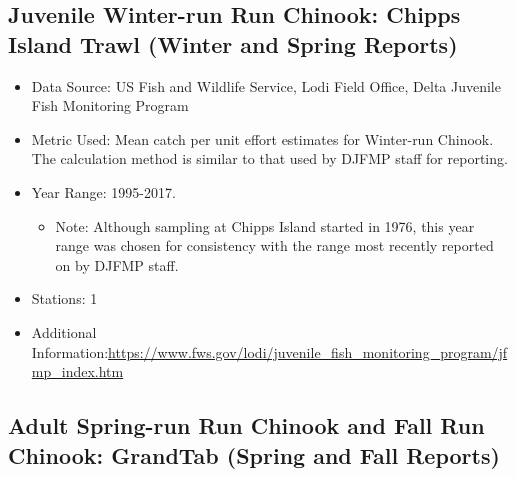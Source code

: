 \documentclass[
]{book}
\providecommand{\tightlist}{%
  \setlength{\itemsep}{0pt}\setlength{\parskip}{0pt}}
\begin{document}
\hypertarget{juvenile-winter-run-run-chinook-chipps-island-trawl-winter-and-spring-reports}{%
\subsection{Juvenile Winter-run Run Chinook: Chipps Island Trawl (Winter and Spring Reports)}\label{juvenile-winter-run-run-chinook-chipps-island-trawl-winter-and-spring-reports}}

\begin{itemize}
\tightlist
\item
  Data Source: US Fish and Wildlife Service, Lodi Field Office, Delta Juvenile Fish Monitoring Program
\item
  Metric Used: Mean catch per unit effort estimates for Winter-run Chinook. The calculation method is similar to that used by DJFMP staff for reporting.
\item
  Year Range: 1995-2017.

  \begin{itemize}
  \tightlist
  \item
    Note: Although sampling at Chipps Island started in 1976, this year range was chosen for consistency with the range most recently reported on by DJFMP staff.
  \end{itemize}
\item
  Stations: 1
\item
  Additional Information:\url{https://www.fws.gov/lodi/juvenile_fish_monitoring_program/jfmp_index.htm}
\end{itemize}

\hypertarget{adult-spring-run-run-chinook-and-fall-run-chinook-grandtab-spring-and-fall-reports}{%
\subsection{Adult Spring-run Run Chinook and Fall Run Chinook: GrandTab (Spring and Fall Reports)}\label{adult-spring-run-run-chinook-and-fall-run-chinook-grandtab-spring-and-fall-reports}}
\end{document}

